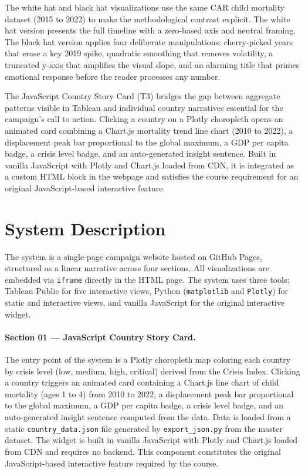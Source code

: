 \documentclass{article}
\begin{document}
The white hat and black hat visualizations use the same CAR child mortality dataset (2015 to 2022) to make the methodological contrast explicit. The white hat version presents the full timeline with a zero-based axis and neutral framing. The black hat version applies four deliberate manipulations: cherry-picked years that erase a key 2019 spike, quadratic smoothing that removes volatility, a truncated y-axis that amplifies the visual slope, and an alarming title that primes emotional response before the reader processes any number.

The JavaScript Country Story Card (T3) bridges the gap between aggregate patterns visible in Tableau and individual country narratives essential for the campaign's call to action. Clicking a country on a Plotly choropleth opens an animated card combining a Chart.js mortality trend line chart (2010 to 2022), a displacement peak bar proportional to the global maximum, a GDP per capita badge, a crisis level badge, and an auto-generated insight sentence. Built in vanilla JavaScript with Plotly and Chart.js loaded from CDN, it is integrated as a custom HTML block in the webpage and satisfies the course requirement for an original JavaScript-based interactive feature.

\section{System Description}

The system is a single-page campaign website hosted on GitHub Pages, structured as a linear narrative across four sections. All visualizations are embedded via \texttt{iframe} directly in the HTML page. The system uses three tools: Tableau Public for five interactive views, Python (\texttt{matplotlib} and \texttt{Plotly}) for static and interactive views, and vanilla JavaScript for the original interactive widget.

\paragraph{Section 01 --- JavaScript Country Story Card.}
The entry point of the system is a Plotly choropleth map coloring each country by crisis level (low, medium, high, critical) derived from the Crisis Index. Clicking a country triggers an animated card containing a Chart.js line chart of child mortality (ages 1 to 4) from 2010 to 2022, a displacement peak bar proportional to the global maximum, a GDP per capita badge, a crisis level badge, and an auto-generated insight sentence computed from the data. Data is loaded from a static \texttt{country\_data.json} file generated by \texttt{export\_json.py} from the master dataset. The widget is built in vanilla JavaScript with Plotly and Chart.js loaded from CDN and requires no backend. This component constitutes the original JavaScript-based interactive feature required by the course.
\end{document}
